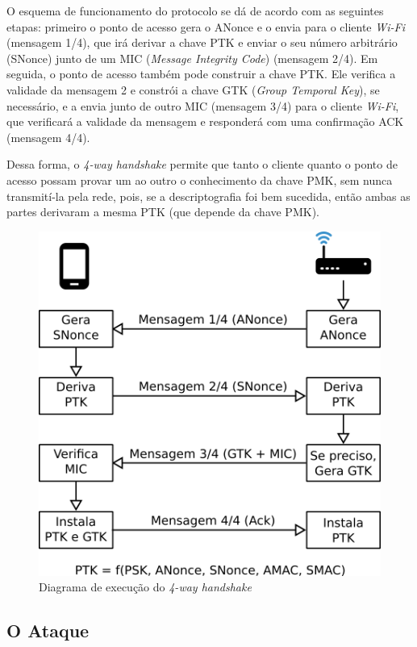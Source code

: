 \documentclass[12pt]{article}
\begin{document}
O esquema de funcionamento do protocolo se dá de acordo com as seguintes etapas: primeiro o ponto de acesso gera o ANonce e o envia para o cliente \textit{Wi-Fi} (mensagem 1/4), que irá derivar a chave PTK e enviar o seu número arbitrário (SNonce) junto de um MIC (\textit{Message Integrity Code}) (mensagem 2/4). Em seguida, o ponto de acesso também pode construir a chave PTK. Ele verifica a validade da mensagem 2 e constrói a chave GTK (\textit{Group Temporal Key}), se necessário, e a envia junto de outro MIC (mensagem 3/4) para o cliente \textit{Wi-Fi}, que verificará a validade da mensagem e responderá com uma confirmação ACK (mensagem 4/4).

Dessa forma, o \textit{4-way handshake} permite que tanto o cliente quanto o ponto de acesso possam provar um ao outro o conhecimento da chave PMK, sem nunca transmití-la pela rede, pois, se a descriptografia foi bem sucedida, então ambas as partes derivaram a mesma PTK (que depende da chave PMK).
    

\begin{figure}[H]
	\begin{center}
    	\includegraphics[width=12cm]{Handshake.png}
    	\caption{Diagrama de execução do \textit{4-way handshake}}
    	\label{fig:handshake}
	\end{center}		
\end{figure}

\subsection{O Ataque}
\end{document}
